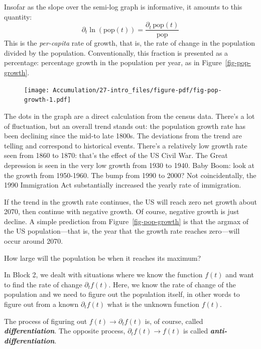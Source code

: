 \documentclass[
  letterpaper,
  DIV=11,
  numbers=noendperiod,
  oneside]{scrreprt}
\begin{document}
Insofar as the slope over the semi-log graph is informative, it amounts
to this quantity:
\[\partial_t \ln(\text{pop}(t)) = \frac{\partial_t\, \text{pop}(t)}{\text{pop}}\]
This is the \emph{per-capita} rate of growth, that is, the rate of
change in the population divided by the population. Conventionally, this
fraction is presented as a percentage: percentage growth in the
population per year, as in Figure~\ref{fig-pop-growth}.

\begin{figure}


{\centering \texttt{[image: Accumulation/27-intro\_files/figure-pdf/fig-pop-growth-1.pdf]}

}

\end{figure}

The dots in the graph are a direct calculation from the census data.
There's a lot of fluctuation, but an overall trend stands out: the
population growth rate has been declining since the mid-to late 1800s.
The deviations from the trend are telling and correspond to historical
events. There's a relatively low growth rate seen from 1860 to 1870:
that's the effect of the US Civil War. The Great depression is seen in
the very low growth from 1930 to 1940. Baby Boom: look at the growth
from 1950-1960. The bump from 1990 to 2000? Not coincidentally, the 1990
Immigration Act substantially increased the yearly rate of immigration.

If the trend in the growth rate continues, the US will reach zero net
growth about 2070, then continue with negative growth. Of course,
negative growth is just decline. A simple prediction from
Figure~\ref{fig-pop-growth} is that the argmax of the US
population---that is, the year that the growth rate reaches zero---will
occur around 2070.

How large will the population be when it reaches its maximum?

In Block 2, we dealt with situations where we know the function \(f(t)\)
and want to find the rate of change \(\partial_t f(t)\). Here, we know
the rate of change of the population and we need to figure out the
population itself, in other words to figure out from a known
\(\partial_t f(t)\) what is the unknown function \(f(t)\).

The process of figuring out \(f(t) \longrightarrow \partial_t f(t)\) is,
of course, called \textbf{\emph{differentiation}}. The opposite process,
\(\partial_t f(t) \longrightarrow f(t)\) is called
\textbf{\emph{anti-differentiation}}.
\end{document}
